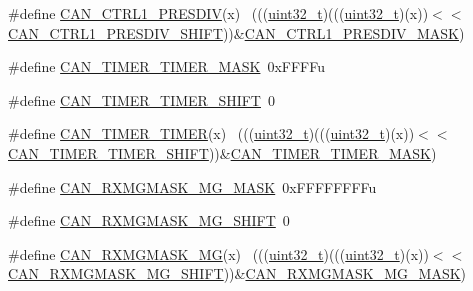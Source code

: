 \begin{DoxyCompactItemize}
\item 
\#define \hyperlink{group___c_a_n___register___masks_gae4f2537b17cd4d3cf314a10cec573fbd}{C\+A\+N\+\_\+\+C\+T\+R\+L1\+\_\+\+P\+R\+E\+S\+D\+IV}(x)                                      ~(((\hyperlink{_p_e___types_8h_a33594304e786b158f3fb30289278f5af}{uint32\+\_\+t})(((\hyperlink{_p_e___types_8h_a33594304e786b158f3fb30289278f5af}{uint32\+\_\+t})(x))$<$$<$\hyperlink{group___c_a_n___register___masks_ga762ed1bd89d4db4a6f34a12f8ae0afcf}{C\+A\+N\+\_\+\+C\+T\+R\+L1\+\_\+\+P\+R\+E\+S\+D\+I\+V\+\_\+\+S\+H\+I\+FT}))\&\hyperlink{group___c_a_n___register___masks_gad8d384c87d48a3fc0b1ae52949823818}{C\+A\+N\+\_\+\+C\+T\+R\+L1\+\_\+\+P\+R\+E\+S\+D\+I\+V\+\_\+\+M\+A\+SK})
\item 
\#define \hyperlink{group___c_a_n___register___masks_gaa7323a19c6c05a13fdf8489331e9671f}{C\+A\+N\+\_\+\+T\+I\+M\+E\+R\+\_\+\+T\+I\+M\+E\+R\+\_\+\+M\+A\+SK}~0x\+F\+F\+F\+Fu
\item 
\#define \hyperlink{group___c_a_n___register___masks_gac979f0c3637eddae258cc50c0e9bb9cf}{C\+A\+N\+\_\+\+T\+I\+M\+E\+R\+\_\+\+T\+I\+M\+E\+R\+\_\+\+S\+H\+I\+FT}~0
\item 
\#define \hyperlink{group___c_a_n___register___masks_ga48012976326bd0be5c71b2ce472a19ae}{C\+A\+N\+\_\+\+T\+I\+M\+E\+R\+\_\+\+T\+I\+M\+ER}(x)                                          ~(((\hyperlink{_p_e___types_8h_a33594304e786b158f3fb30289278f5af}{uint32\+\_\+t})(((\hyperlink{_p_e___types_8h_a33594304e786b158f3fb30289278f5af}{uint32\+\_\+t})(x))$<$$<$\hyperlink{group___c_a_n___register___masks_gac979f0c3637eddae258cc50c0e9bb9cf}{C\+A\+N\+\_\+\+T\+I\+M\+E\+R\+\_\+\+T\+I\+M\+E\+R\+\_\+\+S\+H\+I\+FT}))\&\hyperlink{group___c_a_n___register___masks_gaa7323a19c6c05a13fdf8489331e9671f}{C\+A\+N\+\_\+\+T\+I\+M\+E\+R\+\_\+\+T\+I\+M\+E\+R\+\_\+\+M\+A\+SK})
\item 
\#define \hyperlink{group___c_a_n___register___masks_ga2d7a5f68a7047b3c535a554cc113ef4b}{C\+A\+N\+\_\+\+R\+X\+M\+G\+M\+A\+S\+K\+\_\+\+M\+G\+\_\+\+M\+A\+SK}~0x\+F\+F\+F\+F\+F\+F\+F\+Fu
\item 
\#define \hyperlink{group___c_a_n___register___masks_ga1ace67c70d9f25a27ca39ce78cb0034d}{C\+A\+N\+\_\+\+R\+X\+M\+G\+M\+A\+S\+K\+\_\+\+M\+G\+\_\+\+S\+H\+I\+FT}~0
\item 
\#define \hyperlink{group___c_a_n___register___masks_gafff55f047dbc3c1e1bccd43c79897c08}{C\+A\+N\+\_\+\+R\+X\+M\+G\+M\+A\+S\+K\+\_\+\+MG}(x)                                          ~(((\hyperlink{_p_e___types_8h_a33594304e786b158f3fb30289278f5af}{uint32\+\_\+t})(((\hyperlink{_p_e___types_8h_a33594304e786b158f3fb30289278f5af}{uint32\+\_\+t})(x))$<$$<$\hyperlink{group___c_a_n___register___masks_ga1ace67c70d9f25a27ca39ce78cb0034d}{C\+A\+N\+\_\+\+R\+X\+M\+G\+M\+A\+S\+K\+\_\+\+M\+G\+\_\+\+S\+H\+I\+FT}))\&\hyperlink{group___c_a_n___register___masks_ga2d7a5f68a7047b3c535a554cc113ef4b}{C\+A\+N\+\_\+\+R\+X\+M\+G\+M\+A\+S\+K\+\_\+\+M\+G\+\_\+\+M\+A\+SK})
$$
\end{DoxyCompactItemize}
